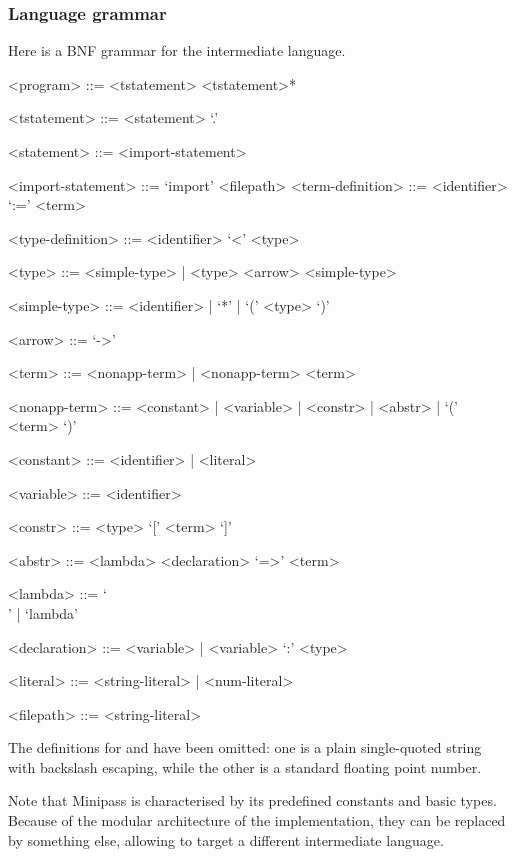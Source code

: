 \documentclass[main.tex]{subfiles}
\begin{document}
\subsubsection{Language grammar}
\label{minipass:grammar}
Here is a BNF grammar for the intermediate language.
\begin{grammar}
    <program> ::= <tstatement> <tstatement>*

    <tstatement> ::= <statement> `.'

    <statement>  ::= <import-statement>

    <import-statement> ::= `import' <filepath>
    <term-definition>  ::= <identifier> `:=' <term>

    <type-definition>  ::= <identifier> `<' <type>

    <type> ::= <simple-type> | <type> <arrow> <simple-type>

    <simple-type> ::= <identifier> | `*' | `(' <type> `)'

    <arrow> ::= `->'

    <term> ::= <nonapp-term> | <nonapp-term> <term>

    <nonapp-term> ::= <constant> | <variable> | <constr> | <abstr> | `(' <term> `)'

    <constant> ::= <identifier> | <literal>

    <variable> ::= <identifier>

    <constr> ::= <type> `[' <term> `]'

    <abstr> ::= <lambda> <declaration> `=>' <term>

    <lambda> ::= `\\' | `lambda'

    <declaration> ::= <variable> | <variable> `:' <type>

    <literal> ::= <string-literal> | <num-literal>

    <filepath> ::= <string-literal>
\end{grammar}

The definitions for  and 
have been omitted: one is a plain single-quoted string with backslash escaping,
while the other is a standard floating point number.

Note that Minipass is characterised by its predefined constants and basic
types. Because of the modular architecture of the implementation, they can be
replaced by something else, allowing to target a different intermediate language.
\end{document}
